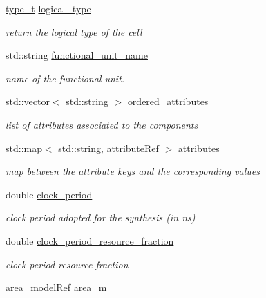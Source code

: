 \begin{DoxyCompactItemize}
\item 
\hyperlink{structfunctional__unit_abf715beb1f09a03995234a68c1478bfe}{type\+\_\+t} \hyperlink{structfunctional__unit_a53abe80d027ef571d2e49d3a38a2c336}{logical\+\_\+type}
\begin{DoxyCompactList}\small\item\em return the logical type of the cell \end{DoxyCompactList}\item 
std\+::string \hyperlink{structfunctional__unit_aaec37da166bb4179edfe4f8d1faaa157}{functional\+\_\+unit\+\_\+name}
\begin{DoxyCompactList}\small\item\em name of the functional unit. \end{DoxyCompactList}\item 
std\+::vector$<$ std\+::string $>$ \hyperlink{structfunctional__unit_aabf1baef8b91d54997fab1d56cb3d829}{ordered\+\_\+attributes}
\begin{DoxyCompactList}\small\item\em list of attributes associated to the components \end{DoxyCompactList}\item 
std\+::map$<$ std\+::string, \hyperlink{library__manager_8hpp_a46399d2eacc03fb10f84fb33987ab8e3}{attribute\+Ref} $>$ \hyperlink{structfunctional__unit_aadd67b69373fed207c5c01ebaf984eea}{attributes}
\begin{DoxyCompactList}\small\item\em map between the attribute keys and the corresponding values \end{DoxyCompactList}\item 
double \hyperlink{structfunctional__unit_a23b09a94ab9ead08b5d93a26abcf4af4}{clock\+\_\+period}
\begin{DoxyCompactList}\small\item\em clock period adopted for the synthesis (in ns) \end{DoxyCompactList}\item 
double \hyperlink{structfunctional__unit_ac14d8f1cd1dda0cfa4479ce413f5931b}{clock\+\_\+period\+\_\+resource\+\_\+fraction}
\begin{DoxyCompactList}\small\item\em clock period resource fraction \end{DoxyCompactList}\item 
\hyperlink{area__model_8hpp_aec11e4e9b1b3afd49a437cb37df0abfb}{area\+\_\+model\+Ref} \hyperlink{structfunctional__unit_a8ffb95d2339f1482194eeaa2bd3f7242}{area\+\_\+m}

\end{DoxyCompactItemize}
